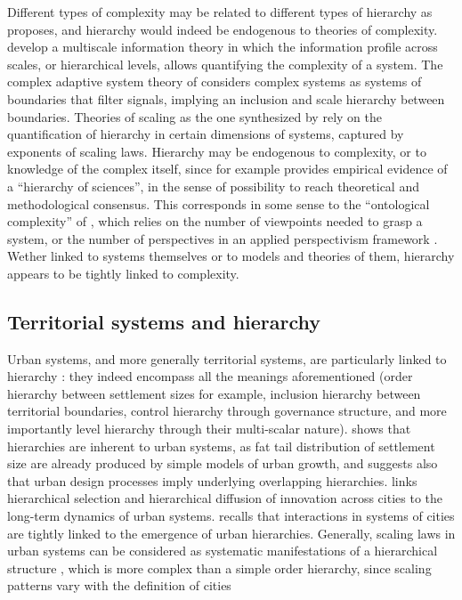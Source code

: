 \documentclass[english,fleqn,allpages]{ISTE_science}[2018/07/30]
\begin{document}
Different types of complexity may be related to different types of hierarchy as \cite{raimbault:halshs-02089520} proposes, and hierarchy would indeed be endogenous to theories of complexity. \cite{allen2017multiscale} develop a multiscale information theory in which the information profile across scales, or hierarchical levels, allows quantifying the complexity of a system. The complex adaptive system theory of \cite{holland2012signals} considers complex systems as systems of boundaries that filter signals, implying an inclusion and scale hierarchy between boundaries. Theories of scaling as the one synthesized by \cite{west2017scale} rely on the quantification of hierarchy in certain dimensions of systems, captured by exponents of scaling laws. Hierarchy may be endogenous to complexity, or to knowledge of the complex itself, since for example \cite{fanelli2013bibliometric} provides empirical evidence of a ``hierarchy of sciences'', in the sense of possibility to reach theoretical and methodological consensus. This corresponds in some sense to the ``ontological complexity'' of \cite{pumain2003approche}, which relies on the number of viewpoints needed to grasp a system, or the number of perspectives in an applied perspectivism framework \citep{2018arXiv181104270R}. Wether linked to systems themselves or to models and theories of them, hierarchy appears to be tightly linked to complexity.



\subsection{Territorial systems and hierarchy}


Urban systems, and more generally territorial systems, are particularly linked to hierarchy \citep{pumain2006hierarchy}: they indeed encompass all the meanings aforementioned (order hierarchy between settlement sizes for example, inclusion hierarchy between territorial boundaries, control hierarchy through governance structure, and more importantly level hierarchy through their multi-scalar nature). \cite{batty2006hierarchy} shows that hierarchies are inherent to urban systems, as fat tail distribution of settlement size are already produced by simple models of urban growth, and suggests also that urban design processes imply underlying overlapping hierarchies. \cite{pumain2006alternative} links hierarchical selection and hierarchical diffusion of innovation across cities to the long-term dynamics of urban systems. \cite{pumain:halshs-02303136} recalls that interactions in systems of cities are tightly linked to the emergence of urban hierarchies. Generally, scaling laws in urban systems can be considered as systematic manifestations of a hierarchical structure \citep{pumain2004scaling}, which is more complex than a simple order hierarchy, since scaling patterns vary with the definition of cities \cite{cottineau2017diverse}
\end{document}
